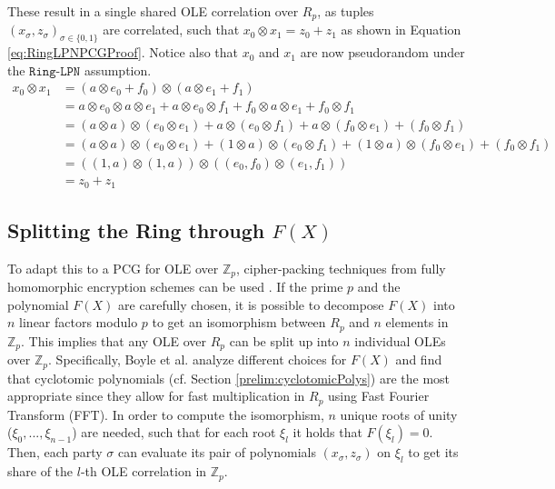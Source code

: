 These result in a single shared OLE correlation over $R_p$, as tuples $(x_\sigma, z_\sigma)_{\sigma\in\{0,1\}}$ are correlated, such that $x_0\otimes x_1 = z_0 + z_1$ as shown in Equation \ref{eq:RingLPNPCGProof}. Notice also that $x_0$ and $x_1$ are now pseudorandom under the $\texttt{Ring-LPN}$ assumption.
\begin{equation}
\begin{aligned}
x_0 \otimes x_1 &= (a \otimes e_0 + f_0) \otimes (a \otimes e_1 + f_1) \\
    &= a \otimes e_0  \otimes a \otimes e_1 + a \otimes e_0 \otimes f_1 + f_0 \otimes a \otimes e_1 + f_0 \otimes f_1 \\
    &= (a \otimes a) \otimes (e_0 \otimes e_1) + a \otimes (e_0 \otimes f_1)  + a \otimes (f_0 \otimes e_1)  + (f_0 \otimes f_1) \\
    &= (a \otimes a) \otimes (e_0 \otimes e_1) + (1 \otimes a) \otimes (e_0 \otimes f_1)  + (1 \otimes a) \otimes (f_0 \otimes e_1)  + (f_0 \otimes f_1) \\
    &= ((1,a) \otimes (1,a)) \otimes ((e_0, f_0) \otimes (e_1, f_1)) \\
    &= z_0 + z_1
\label{eq:RingLPNPCGProof}
\end{aligned}
\end{equation}

\subsection{Splitting the Ring through $F(X)$}
\label{subseq:realtiontofx}
To adapt this to a PCG for OLE over $\mathbb{Z}_p$, cipher-packing techniques from fully homomorphic encryption schemes can be used \cite{smart2014fully}. If the prime $p$ and the polynomial $F(X)$ are carefully chosen, it is possible to decompose $F(X)$ into $n$ linear factors modulo $p$ to get an isomorphism between $R_p$ and $n$ elements in $\mathbb{Z}_p$. This implies that any OLE over $R_p$ can be split up into $n$ individual OLEs over $\mathbb{Z}_p$. Specifically, Boyle et al. \cite{boyle2020efficient} analyze different choices for $F(X)$ and find that cyclotomic polynomials (cf. Section \ref{prelim:cyclotomicPolys}) are the most appropriate since they allow for fast multiplication in $R_p$ using Fast Fourier Transform (FFT). In order to compute the isomorphism, $n$ unique roots of unity ($\xi_0, ...,\xi_{n-1}$) are needed, such that for each root $\xi_l$ it holds that $F(\xi_l)=0$. Then, each party $\sigma$ can evaluate its pair of polynomials $(x_\sigma, z_\sigma)$ on $\xi_l$ to get its share of the $l$-th OLE correlation in $\mathbb{Z}_p$.

